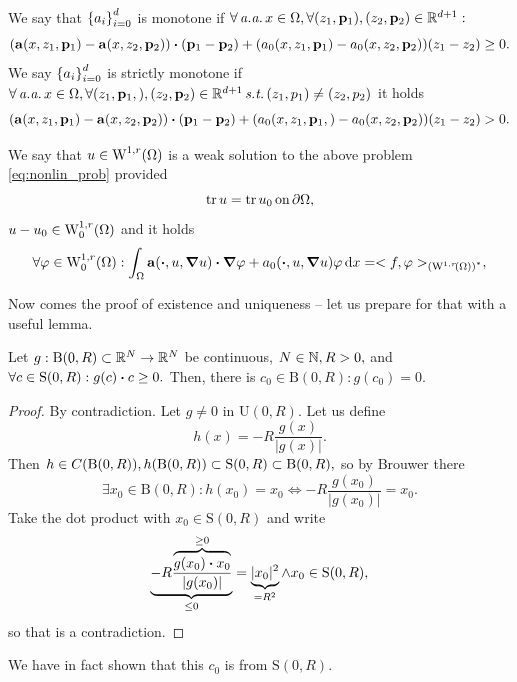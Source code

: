 \documentclass{article}
\begin{document}
\begin{definition}[Monotonicity]
	We say that $\qty{a_i}_{i=0}^d$ is monotone if $\forall \, \text{\textit{a.a.}} \, x \in \Omega, \forall \qty(z_1, \vb{p}_1), \qty(z_2, \vb{p}_2) \in {\mathbb R}^{d+1}:$
	\[
		\qty(\vb{a}\qty(x,z_1,\vb{p}_1)-\vb{a}\qty(x,z_2,\vb{p}_2))\vdot (\vb{p}_1 - \vb{p}_2) + (a_0\qty(x,z_1,\vb{p}_1)-a_0\qty(x,z_2,\vb{p}_2))(z_1 - z_2) \geq 0.
	\]
	We say $\qty{a_i}_{i=0}^d$ is strictly monotone if $\forall \, \text{\textit{a.a.}} \,x \in \Omega, \forall \qty(z_1, \vb{p}_1,), \qty(z_2, \vb{p}_2) \in {\mathbb R}^{d+1} \, \text{\textit{s.t.}} \, \qty(z_1,p_1) \neq \qty(z_2, p_2)$ it holds 
	\[
		\qty(\vb{a}\qty(x,z_1, \vb{p}_1) - \vb{a}\qty(x, z_2, \vb{p}_2)) \vdot \qty(\vb{p}_1 - \vb{p}_2) + \qty(a_0\qty(x,z_1, \vb{p}_1,)-a_0\qty(x,z_2, \vb{p}_2))\qty(z_1 - z_2) > 0.
	\]
\end{definition}

\begin{definition}
	We say that $u \in \WkpSet[1][r]{\Omega}$ is a weak solution to the above problem \ref{eq:nonlin_prob} provided
	\[
		\trace u = \trace u_0 \, \text{on} \, \partial \Omega,
	\]
	$u - u_0 \in \WkpzeroSet[1][r]{\Omega}$ and it holds
	\[
		\forall \varphi \in \WkpzeroSet[1][r]{\Omega}: \int_{\Omega}\vb{a}\qty(\vdot, u, \grad u)\vdot \grad \varphi +a_0\qty(\vdot, u, \grad u) \varphi \dd{x} = <f,\varphi>_{\qty(\WkpSet[1][r]{\Omega})^{*}}, 
	\]
\end{definition}

Now comes the proof of existence and uniqueness -- let us prepare for that with a useful lemma.

\begin{lemma}
	Let $g: \text{B}(0,R) \subset {\mathbb R}^N \to {\mathbb R}^N$ be continuous, $N \in {\mathbb N}, R>0,$ and $\forall c \in \text{S}(0,R): g(c) \vdot c \geq 0.$ Then, there is $c_0 \in \text{B}(0,R): g(c_0) = 0.$
	\begin{proof}
		By contradiction. Let $g \neq 0$ in $\text{U}(0,R)$. Let us define
		\[
			h(x) = -R\frac{g(x)}{|g(x)|}.
		\]
		Then $h \in C\qty(\text{B}(0,R)), h\qty(\text{B}(0,R)) \subset \text{S}(0,R)\subset \text{B}(0,R),$ so by Brouwer there
		\[
			\exists x_0 \in \text{B}(0,R): h(x_0) = x_0 \Leftrightarrow -R \frac{g(x_0)}{|g(x_0)|} = x_0.
		\]
		Take the dot product with $x_0 \in \text{S}(0,R)$ and write
		\[
			\underbrace{-R \frac{\overbrace{g(x_0) \vdot x_0}^{\geq 0}}{|g(x_0)|}}_{\leq 0} = \underbrace{|x_0|^{2}}_{ = R^{2}} \wedge x_0 \in \text{S}(0,R),
		\]
		so that is a contradiction.
	\end{proof}
\end{lemma}
\begin{remark}
    We have in fact shown that this $c_0$ is from $\text{S}(0,R).$
\end{remark}
\end{document}
